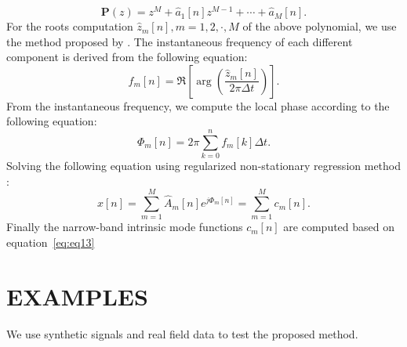 \begin{equation}
    \mathbf{P}(z) = z^M + \hat{a}_1[n] z^{M-1} + \cdots + \hat{a}_M[n].
\end{equation}
For the roots computation $\hat{z}_m[n], m=1,2,\cdot,M$ of the above polynomial, we 
use the method proposed by \citet[]{roots}. 
The instantaneous frequency of each different component is derived from the following equation:
\begin{equation}
    f_m[n] = \Re \left[ \arg \left( \frac{\hat{z}_m[n]}{2\pi \Delta t} \right) \right].
\end{equation}
From the instantaneous frequency, we compute the local phase according to the following equation:
\begin{equation}
    \Phi_m[n] = 2\pi\sum_{k=0}^{n}f_m[k]\Delta t.
\end{equation}
Solving the following equation using 
regularized non-stationary regression method \cite[]{fomel2013}:
\begin{equation}
    \label{eq:eq13}
    x[n] = \sum_{m=1}^{M} \hat{A}_m[n]e^{j \Phi_m[n]} =
     \sum_{m=1}^{M} c_m[n].
\end{equation} 
Finally the narrow-band intrinsic mode functions $c_m[n]$ are computed based on equation~\ref{eq:eq13}

\section{EXAMPLES}
We use synthetic signals and real field data to test the proposed method.
